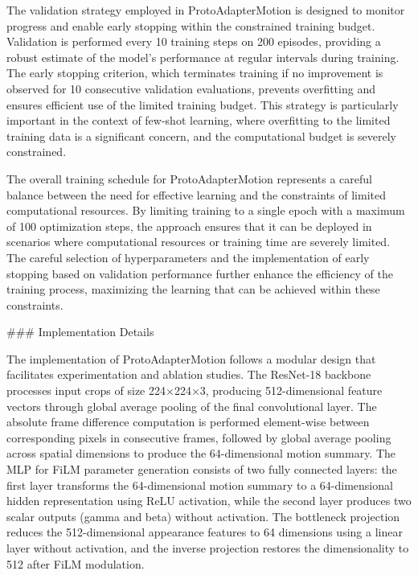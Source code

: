 \documentclass[11pt]{article}
\begin{document}
The validation strategy employed in ProtoAdapterMotion is designed to monitor progress and enable early stopping within the constrained training budget. Validation is performed every 10 training steps on 200 episodes, providing a robust estimate of the model's performance at regular intervals during training. The early stopping criterion, which terminates training if no improvement is observed for 10 consecutive validation evaluations, prevents overfitting and ensures efficient use of the limited training budget. This strategy is particularly important in the context of few-shot learning, where overfitting to the limited training data is a significant concern, and the computational budget is severely constrained.

The overall training schedule for ProtoAdapterMotion represents a careful balance between the need for effective learning and the constraints of limited computational resources. By limiting training to a single epoch with a maximum of 100 optimization steps, the approach ensures that it can be deployed in scenarios where computational resources or training time are severely limited. The careful selection of hyperparameters and the implementation of early stopping based on validation performance further enhance the efficiency of the training process, maximizing the learning that can be achieved within these constraints.

### Implementation Details

The implementation of ProtoAdapterMotion follows a modular design that facilitates experimentation and ablation studies. The ResNet-18 backbone processes input crops of size 224×224×3, producing 512-dimensional feature vectors through global average pooling of the final convolutional layer. The absolute frame difference computation is performed element-wise between corresponding pixels in consecutive frames, followed by global average pooling across spatial dimensions to produce the 64-dimensional motion summary. The MLP for FiLM parameter generation consists of two fully connected layers: the first layer transforms the 64-dimensional motion summary to a 64-dimensional hidden representation using ReLU activation, while the second layer produces two scalar outputs (gamma and beta) without activation. The bottleneck projection reduces the 512-dimensional appearance features to 64 dimensions using a linear layer without activation, and the inverse projection restores the dimensionality to 512 after FiLM modulation.
\end{document}
